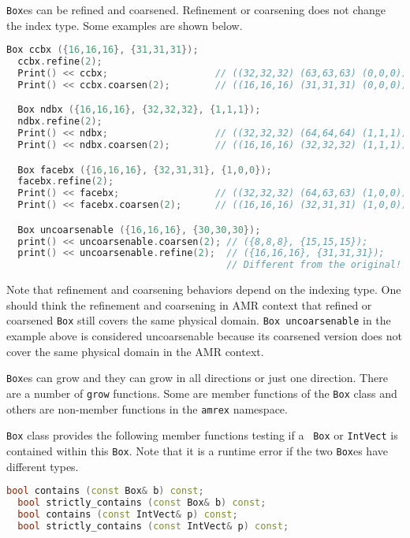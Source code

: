 {\tt Box}es can be refined and coarsened.  Refinement or coarsening
does not change the index type.  Some examples are shown below.
\begin{lstlisting}[language=cpp]
  Box ccbx ({16,16,16}, {31,31,31});
  ccbx.refine(2);
  Print() << ccbx;                   // ((32,32,32) (63,63,63) (0,0,0))
  Print() << ccbx.coarsen(2);        // ((16,16,16) (31,31,31) (0,0,0))

  Box ndbx ({16,16,16}, {32,32,32}, {1,1,1});
  ndbx.refine(2);
  Print() << ndbx;                   // ((32,32,32) (64,64,64) (1,1,1))
  Print() << ndbx.coarsen(2);        // ((16,16,16) (32,32,32) (1,1,1))

  Box facebx ({16,16,16}, {32,31,31}, {1,0,0});
  facebx.refine(2);
  Print() << facebx;                 // ((32,32,32) (64,63,63) (1,0,0))
  Print() << facebx.coarsen(2);      // ((16,16,16) (32,31,31) (1,0,0))

  Box uncoarsenable ({16,16,16}, {30,30,30});
  print() << uncoarsenable.coarsen(2); // ({8,8,8}, {15,15,15});
  print() << uncoarsenable.refine(2);  // ({16,16,16}, {31,31,31});
                                       // Different from the original!
\end{lstlisting}
Note that refinement and coarsening behaviors depend on the indexing
type.  One should think the refinement and coarsening in AMR context
that refined or coarsened {\tt Box} still covers the same physical
domain.  {\tt Box uncoarsenable} in the example above is considered
uncoarsenable because its coarsened version does not cover the same
physical domain in the AMR context.

{\tt Box}es can grow and they can grow in all directions or just one
direction.  There are a number of {\tt grow} functions.  Some are
member functions of the {\tt Box} class and others are non-member
functions in the {\tt amrex} namespace. 

{\tt Box} class provides the following member functions testing if a {\tt
  Box} or {\tt IntVect} is contained within this {\tt Box}.  Note that
it is a runtime error if the two {\tt Box}es have different types.
\begin{lstlisting}[language=cpp]
  bool contains (const Box& b) const;
  bool strictly_contains (const Box& b) const;
  bool contains (const IntVect& p) const;
  bool strictly_contains (const IntVect& p) const;
\end{lstlisting}

